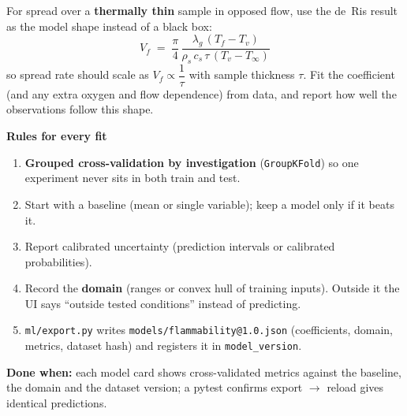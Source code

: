 \documentclass[11pt,a4paper]{article}
\newcommand{\code}[1]{\texttt{#1}}
\newcommand{\done}[1]{\begin{donebox}\textbf{Done when:} #1\end{donebox}}
\begin{document}
\medskip
For spread over a \textbf{thermally thin} sample in opposed flow, use the de~Ris result as the model shape instead of a black box:
\[
  V_f \;=\; \dfrac{\pi}{4}\,\dfrac{\lambda_g\,(T_f - T_v)}{\rho_s\, c_s\, \tau\,(T_v - T_\infty)}
\]
so spread rate should scale as $V_f \propto \dfrac{1}{\tau}$ with sample thickness $\tau$. Fit the coefficient (and any extra oxygen and flow dependence) from data, and report how well the observations follow this shape.

\medskip\noindent\textbf{Rules for every fit}
\begin{enumerate}
  \item \textbf{Grouped cross-validation by investigation} (\code{GroupKFold}) so one experiment never sits in both train and test.
  \item Start with a baseline (mean or single variable); keep a model only if it beats it.
  \item Report calibrated uncertainty (prediction intervals or calibrated probabilities).
  \item Record the \textbf{domain} (ranges or convex hull of training inputs). Outside it the UI says ``outside tested conditions'' instead of predicting.
  \item \code{ml/export.py} writes \code{models/flammability@1.0.json} (coefficients, domain, metrics, dataset hash) and registers it in \code{model\_version}.
\end{enumerate}
\done{each model card shows cross-validated metrics against the baseline, the domain and the dataset version; a pytest confirms export $\rightarrow$ reload gives identical predictions.}
\end{document}
